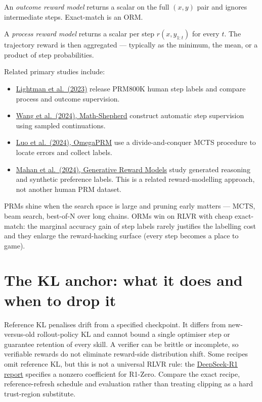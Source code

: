 \documentclass[11pt,oneside]{scrbook}
\begin{document}
\begin{definition}[ORM]
An \emph{outcome reward model} returns a scalar on the full $(x, y)$ pair
and ignores intermediate steps. Exact-match is an ORM.
\end{definition}

\begin{definition}[PRM]
A \emph{process reward model} returns a scalar per step
$r(x, y_{1:t})$ for every $t$. The trajectory reward is then aggregated ---
typically as the minimum, the mean, or a product of step probabilities.
\end{definition}

Related primary studies include:
\begin{itemize}
\item \href{https://arxiv.org/abs/2305.20050}{Lightman et al.\ (2023)}
release PRM800K human step labels and compare process and outcome supervision.
\item \href{https://arxiv.org/abs/2312.08935}{Wang et al.\ (2024), Math-Shepherd}
construct automatic step supervision using sampled continuations.
\item \href{https://arxiv.org/abs/2406.06592}{Luo et al.\ (2024), OmegaPRM}
use a divide-and-conquer MCTS procedure to locate errors and collect labels.
\item \href{https://arxiv.org/abs/2410.12832}{Mahan et al.\ (2024), Generative
Reward Models} study generated reasoning and synthetic preference labels.
This is a related reward-modelling approach, not another human PRM dataset.
\end{itemize}

\begin{intuition}
PRMs shine when the search space is large and pruning early matters ---
MCTS, beam search, best-of-N over long chains. ORMs win on RLVR with cheap
exact-match: the marginal accuracy gain of step labels rarely justifies
the labelling cost and they enlarge the reward-hacking surface (every step
becomes a place to game).
\end{intuition}

\section{The KL anchor: what it does and when to drop it}

Reference KL penalises drift from a specified checkpoint. It differs from
new-versus-old rollout-policy KL and cannot bound a single optimiser step or
guarantee retention of every skill. A verifier can be brittle or incomplete,
so verifiable rewards do not eliminate reward-side distribution shift.
Some recipes omit reference KL, but this is not a universal RLVR rule:
the \href{https://arxiv.org/html/2501.12948}{DeepSeek-R1 report}
specifies a nonzero coefficient for R1-Zero. Compare the exact recipe,
reference-refresh schedule and evaluation rather than treating clipping as
a hard trust-region substitute.
\end{document}
